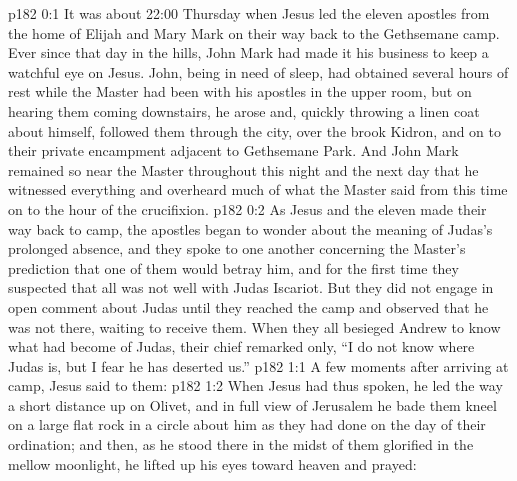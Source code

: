 \author{Midwayer Commission}
\vs p182 0:1 It was about 22:00 Thursday when Jesus led the eleven apostles from the home of Elijah and Mary Mark on their way back to the Gethsemane camp. Ever since that day in the hills, John Mark had made it his business to keep a watchful eye on Jesus. John, being in need of sleep, had obtained several hours of rest while the Master had been with his apostles in the upper room, but on hearing them coming downstairs, he arose and, quickly throwing a linen coat about himself, followed them through the city, over the brook Kidron, and on to their private encampment adjacent to Gethsemane Park. And John Mark remained so near the Master throughout this night and the next day that he witnessed everything and overheard much of what the Master said from this time on to the hour of the crucifixion.
\vs p182 0:2 As Jesus and the eleven made their way back to camp, the apostles began to wonder about the meaning of Judas’s prolonged absence, and they spoke to one another concerning the Master’s prediction that one of them would betray him, and for the first time they suspected that all was not well with Judas Iscariot. But they did not engage in open comment about Judas until they reached the camp and observed that he was not there, waiting to receive them. When they all besieged Andrew to know what had become of Judas, their chief remarked only, “I do not know where Judas is, but I fear he has deserted us.”
\vs p182 1:1 A few moments after arriving at camp, Jesus said to them: 
\vs p182 1:2 When Jesus had thus spoken, he led the way a short distance up on Olivet, and in full view of Jerusalem he bade them kneel on a large flat rock in a circle about him as they had done on the day of their ordination; and then, as he stood there in the midst of them glorified in the mellow moonlight, he lifted up his eyes toward heaven and prayed:
